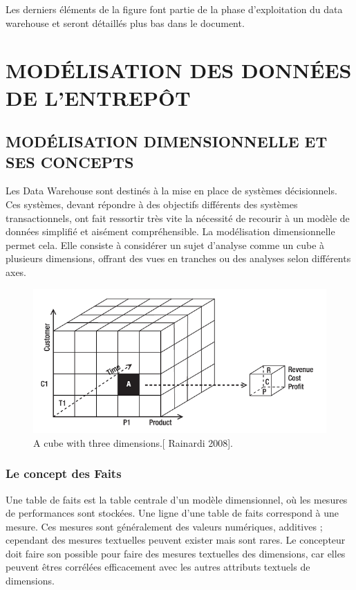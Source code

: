 Les derniers éléments de la figure font partie de la phase d’exploitation du data warehouse et seront détaillés plus bas dans le document.


\section{MODÉLISATION DES DONNÉES DE L'ENTREPÔT}

 \subsection{MODÉLISATION DIMENSIONNELLE ET SES CONCEPTS}
 	Les Data Warehouse sont destinés à la mise en place de systèmes décisionnels. Ces systèmes, devant répondre à des objectifs différents des systèmes transactionnels, ont fait ressortir très vite la nécessité de recourir à un modèle de données simplifié et aisément compréhensible. La modélisation dimensionnelle permet cela. Elle consiste à considérer un sujet d’analyse comme un cube à plusieurs dimensions, offrant des vues en tranches ou des analyses selon différents axes.
 	
 \begin{figure}[h]
	\begin{center}
		\includegraphics[scale=0.85]{images/cube.png}
		\caption{A cube with three dimensions.[ Rainardi 2008].}
		\label{Cube-dimensionnel}
	\end{center}
\end{figure}
 
 
 \subsubsection{Le concept des Faits}
 	 Une table de faits est la table centrale d’un modèle dimensionnel, où les mesures de performances sont stockées. Une ligne d'une table de faits correspond à une mesure. Ces mesures sont généralement des valeurs numériques, additives ; cependant des mesures textuelles peuvent exister mais sont rares. Le concepteur doit faire son possible pour faire des mesures textuelles des dimensions, car elles peuvent êtres corrélées efficacement avec les autres attributs textuels de dimensions.
 
